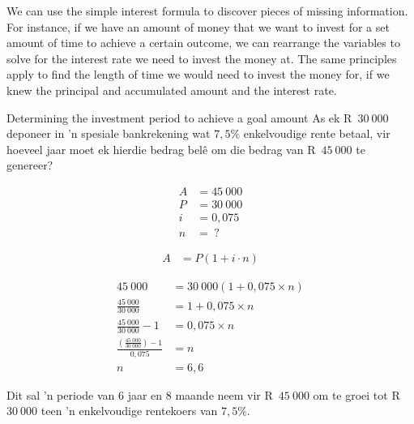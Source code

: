 We can use the simple interest formula to discover pieces of missing information. For instance, if we have an amount of money that we want to invest for a set amount of time to achieve a certain outcome, we can rearrange the variables to solve for the interest rate we need to invest the money at. The same principles apply to find the length of time we would need to invest the money for, if we knew the principal and accumulated amount and the interest rate.


\begin{wex}{Determining the investment period to achieve a goal amount}{
    As ek  R~$30~000$ deponeer in ’n spesiale
bankrekening wat $7,5\%$ enkelvoudige rente betaal, vir hoeveel jaar moet
ek hierdie bedrag belê om die bedrag van R~$45~000$ te genereer?}{

    \begin{align*}
	A &= 45~000\\
	P &= 30~000\\
	i &= 0,075\\
	n &= ~?
    \end{align*}

    \begin{align*}
	A &= P(1 + i \cdot n)
    \end{align*}

    \begin{align*}
	45~000 &= 30~000(1 + 0,075 \times n)\\
	\frac{45~000}{30~000} &= 1 + 0,075 \times n\\
	\frac{45~000}{30~000} -1 &= 0,075 \times n\\
	\frac{(\frac{45~000}{30~000}) -1}{0,075} &= n\\
	n &= 6,6
    \end{align*}

    Dit sal ’n periode van 6 jaar en 8 maande neem vir R~$45~000$ om te groei tot R~$30~000$ teen ’n enkelvoudige rentekoers van $7,5\%$.
    }
\end{wex}




